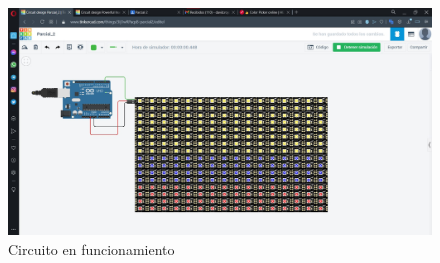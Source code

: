 \documentclass{article}
\begin{document}
    \begin{figure}[h]
    \centering
    \includegraphics[width=1.2\textwidth]{circuito en funcionamiento.jpg}
    \caption{Circuito en funcionamiento}
    \label{fig:circuito_funcionando}
    \end{figure}
\end{document}
